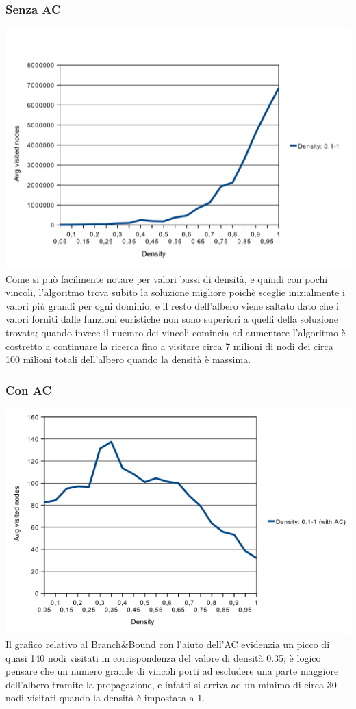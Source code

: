 \documentclass[a4paper,12pt,italian]{article}
\begin{document}
\subsubsection{Senza AC}
\includegraphics[scale=0.6]{dens.png}
\\
Come si pu\`o facilmente notare per valori bassi di densit\`a, e quindi con pochi vincoli, l'algoritmo trova
subito la soluzione migliore poich\`e sceglie inizialmente i valori pi\`u grandi per ogni dominio, e
il resto dell'albero viene saltato dato che i valori forniti dalle funzioni euristiche non sono
superiori a quelli della soluzione trovata; quando invece il nuemro dei vincoli comincia ad
aumentare l'algoritmo \`e costretto a continuare la ricerca fino a visitare circa 7 milioni di nodi dei
circa 100 milioni totali dell'albero quando la densit\`a \`e massima.

\subsubsection{Con AC}
\includegraphics[scale=0.8]{densAC.png}
\\
Il grafico relativo al Branch\&Bound con l'aiuto dell'AC evidenzia un picco di quasi 140 nodi visitati
in corrispondenza del valore di densit\`a 0.35; \`e logico pensare che un numero grande di vincoli 
porti ad escludere una parte maggiore dell'albero tramite la propagazione, e infatti si arriva ad un minimo di circa 
30 nodi visitati quando la densit\`a \`e impostata a 1.
\end{document}
